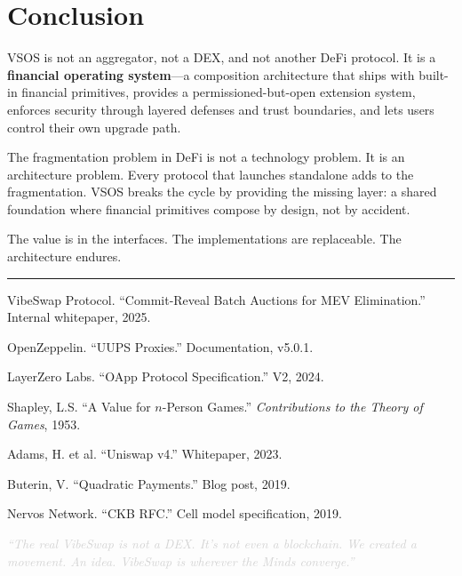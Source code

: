 \documentclass[9pt, letterpaper]{article}
\newcommand{\thinrule}{\vspace{2pt}\noindent\textcolor{rule}{\rule{\textwidth}{0.4pt}}\vspace{2pt}}
\begin{document}

\section{Conclusion}

VSOS is not an aggregator, not a DEX, and not another DeFi protocol. It is a \textbf{financial operating system}---a composition architecture that ships with built-in financial primitives, provides a permissioned-but-open extension system, enforces security through layered defenses and trust boundaries, and lets users control their own upgrade path.

The fragmentation problem in DeFi is not a technology problem. It is an architecture problem. Every protocol that launches standalone adds to the fragmentation. VSOS breaks the cycle by providing the missing layer: a shared foundation where financial primitives compose by design, not by accident.

The value is in the interfaces. The implementations are replaceable. The architecture endures.


\thinrule
{\scriptsize
\begin{enumerate}[leftmargin=1.5em, label={[\arabic*]}]
\item VibeSwap Protocol. ``Commit-Reveal Batch Auctions for MEV Elimination.'' Internal whitepaper, 2025.
\item OpenZeppelin. ``UUPS Proxies.'' Documentation, v5.0.1.
\item LayerZero Labs. ``OApp Protocol Specification.'' V2, 2024.
\item Shapley, L.S. ``A Value for $n$-Person Games.'' \textit{Contributions to the Theory of Games}, 1953.
\item Adams, H. et al. ``Uniswap v4.'' Whitepaper, 2023.
\item Buterin, V. ``Quadratic Payments.'' Blog post, 2019.
\item Nervos Network. ``CKB RFC.'' Cell model specification, 2019.
\end{enumerate}
}

\begin{center}
\textcolor{lightgray}{\scriptsize\textit{``The real VibeSwap is not a DEX. It's not even a blockchain. We created a movement. An idea. VibeSwap is wherever the Minds converge.''}}
\end{center}
\end{document}
